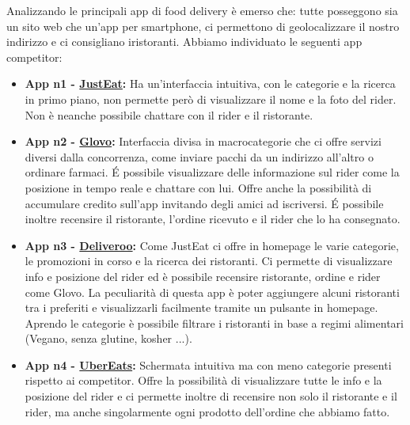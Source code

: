 \documentclass{article}
\begin{document}
     \par
    Analizzando le principali app di food delivery è emerso che: tutte posseggono sia un sito web che un'app per smartphone, ci permettono di geolocalizzare il nostro indirizzo e ci consigliano iristoranti.
    Abbiamo individuato le seguenti app competitor:
\begin{itemize}
        \item \textbf{App n1 - \href{https://www.justeat.it}{JustEat}:} Ha un’interfaccia intuitiva, con le categorie e la ricerca in primo piano, non permette però di visualizzare il nome e la foto del rider. Non è neanche possibile chattare con il rider e il ristorante.

        \item \textbf{App n2 - \href{https://glovoapp.com/it/it/}{Glovo}:} Interfaccia divisa in macrocategorie che ci offre servizi diversi dalla concorrenza, come inviare pacchi da un indirizzo all’altro o ordinare farmaci. É possibile visualizzare delle informazione sul rider come la posizione in tempo reale e chattare con lui. Offre anche la possibilità di accumulare credito sull’app invitando degli amici ad iscriversi. É possibile inoltre recensire il ristorante, l’ordine ricevuto e il rider che lo ha consegnato.

        \item \textbf{App n3 - \href{https://deliveroo.it/it/}{Deliveroo}:} Come JustEat ci offre in homepage le varie categorie, le promozioni in corso e la ricerca dei ristoranti. Ci permette di visualizzare info e posizione del rider ed è possibile recensire ristorante, ordine e rider come Glovo. La peculiarità di questa app è poter aggiungere alcuni ristoranti tra i preferiti e visualizzarli facilmente tramite un pulsante in homepage. Aprendo le categorie è possibile filtrare i ristoranti in base a regimi alimentari (Vegano, senza glutine, kosher ...).

        \item \textbf{App n4 - \href{https://www.ubereats.com/it/feed?diningMode=DELIVERY&pl=JTdCJTIyYWRkcmVzcyUyMiUzQSUyMkxhJTIwUGFnbm90dGVsbGElMjBHb3VybWV0JTIwLSUyMFZpYWxlJTIwSXBwb2NyYXRlJTIwLSUyMFJvbWElMjIlMkMlMjJyZWZlcmVuY2UlMjIlM0ElMjJDaElKVmREYVE2ZGhMeE1SbjI4Y1NxZG1nb0ElMjIlMkMlMjJyZWZlcmVuY2VUeXBlJTIyJTNBJTIyZ29vZ2xlX3BsYWNlcyUyMiUyQyUyMmxhdGl0dWRlJTIyJTNBNDEuOTA4NzUlMkMlMjJsb25naXR1ZGUlMjIlM0ExMi41MjAzODg3JTdE}{UberEats}:} Schermata intuitiva ma con meno categorie presenti rispetto ai competitor. Offre la possibilità di visualizzare tutte le info e la posizione del rider e ci permette inoltre di recensire non solo il ristorante e il rider, ma anche singolarmente ogni prodotto dell’ordine che abbiamo fatto.

\end{itemize}
\end{document}
